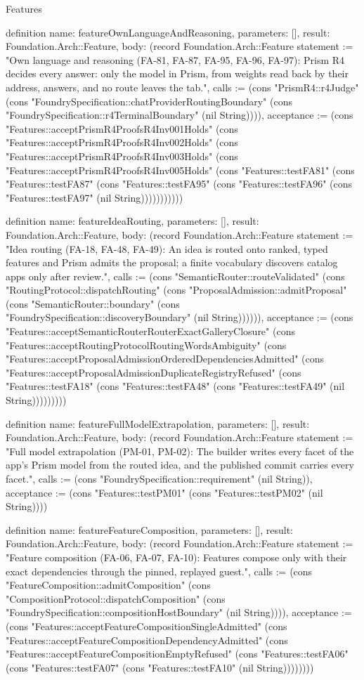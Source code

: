 \begin{lexlean}{Features}
\begin{semanticmodule}
definition{
  name: featureOwnLanguageAndReasoning,
  parameters: [],
  result: Foundation.Arch::Feature,
  body: (record Foundation.Arch::Feature {statement := "Own language and reasoning (FA-81, FA-87, FA-95, FA-96, FA-97): Prism R4 decides every answer: only the model in Prism, from weights read back by their address, answers, and no route leaves the tab.", calls := (cons "PrismR4::r4Judge" (cons "FoundrySpecification::chatProviderRoutingBoundary" (cons "FoundrySpecification::r4TerminalBoundary" (nil String)))), acceptance := (cons "Features::acceptPrismR4ProofsR4Inv001Holds" (cons "Features::acceptPrismR4ProofsR4Inv002Holds" (cons "Features::acceptPrismR4ProofsR4Inv003Holds" (cons "Features::acceptPrismR4ProofsR4Inv005Holds" (cons "Features::testFA81" (cons "Features::testFA87" (cons "Features::testFA95" (cons "Features::testFA96" (cons "Features::testFA97" (nil String))))))))))})
}

definition{
  name: featureIdeaRouting,
  parameters: [],
  result: Foundation.Arch::Feature,
  body: (record Foundation.Arch::Feature {statement := "Idea routing (FA-18, FA-48, FA-49): An idea is routed onto ranked, typed features and Prism admits the proposal; a finite vocabulary discovers catalog apps only after review.", calls := (cons "SemanticRouter::routeValidated" (cons "RoutingProtocol::dispatchRouting" (cons "ProposalAdmission::admitProposal" (cons "SemanticRouter::boundary" (cons "FoundrySpecification::discoveryBoundary" (nil String)))))), acceptance := (cons "Features::acceptSemanticRouterRouterExactGalleryClosure" (cons "Features::acceptRoutingProtocolRoutingWordsAmbiguity" (cons "Features::acceptProposalAdmissionOrderedDependenciesAdmitted" (cons "Features::acceptProposalAdmissionDuplicateRegistryRefused" (cons "Features::testFA18" (cons "Features::testFA48" (cons "Features::testFA49" (nil String))))))))})
}

definition{
  name: featureFullModelExtrapolation,
  parameters: [],
  result: Foundation.Arch::Feature,
  body: (record Foundation.Arch::Feature {statement := "Full model extrapolation (PM-01, PM-02): The builder writes every facet of the app's Prism model from the routed idea, and the published commit carries every facet.", calls := (cons "FoundrySpecification::requirement" (nil String)), acceptance := (cons "Features::testPM01" (cons "Features::testPM02" (nil String)))})
}

definition{
  name: featureFeatureComposition,
  parameters: [],
  result: Foundation.Arch::Feature,
  body: (record Foundation.Arch::Feature {statement := "Feature composition (FA-06, FA-07, FA-10): Features compose only with their exact dependencies through the pinned, replayed guest.", calls := (cons "FeatureComposition::admitComposition" (cons "CompositionProtocol::dispatchComposition" (cons "FoundrySpecification::compositionHostBoundary" (nil String)))), acceptance := (cons "Features::acceptFeatureCompositionSingleAdmitted" (cons "Features::acceptFeatureCompositionDependencyAdmitted" (cons "Features::acceptFeatureCompositionEmptyRefused" (cons "Features::testFA06" (cons "Features::testFA07" (cons "Features::testFA10" (nil String)))))))})
}


\end{semanticmodule}
\end{lexlean}
